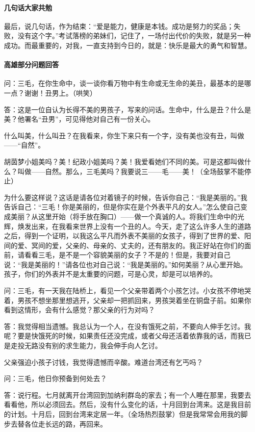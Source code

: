 \paragraph*{几句话大家共勉}
\par 最后，说几句话，作为结束：“爱是能力，健康是本钱。成功是努力的奖品；失败，没有这个字。”考试落榜的弟妹们，记住了，一场付出代价的失败，就是另一种成功。而最重要的，对我，一直支持到今日的，就是：快乐是最大的勇气和智慧。
\paragraph*{高雄部分问题回答}
\par 问：三毛，在你生命中，谈一谈你看万物中有生命或无生命的美丑，最基本的是哪一点？谢谢！丑男上。（哄笑）
\par 答：这是一位自认为长得不美的男孩子，写来的问话。生命中，什么是丑？什么是美？他署名“丑男”，可见得他对自己有一份关心。
\par 什么叫美，什么叫丑？在我看来，你生下来只有一个字，没有美也没有丑，叫做——“自然”。
\par 胡茵梦小姐美吗？美！纪政小姐美吗？美！我爱看她们不同的美。可是这都叫做什么？叫做——自然。那么，三毛美吗？我要说三——毛——美！（全场鼓掌不能停止）
\par 为什么要这样说？这话是请各位对着镜子的时候，告诉你自己：“我是美丽的。”我告诉自己：“三毛！你是美丽的，但是你实在是个外表平凡的女人。”怎么使自己变成美丽？从这里开始（将手放在胸口）——做一个真诚的人。将我们生命中的光辉，焕发出来，在我看来世界上没有一个丑的人。今天，走了这么许多人生的道路之后，得到一个证明，以我这么平凡而外表不美丽的女孩子，得到了世界的爱、阳间的爱、冥间的爱，父亲的、母亲的、丈夫的，还有朋友的。我正好站在你们的面前，请看看三毛，是不是一个容貌美丽的女子？不是的！但是，我要对自己说：“我是美丽的！”请各位也对自己说：“我是美丽的。”如何美丽？从心里开始。孩子，你们的外表并不是太重要的问题，可是心灵，却是可以培养的。
\par 问：三毛，有一天我在陆桥上，看见一个父亲带着两个小孩乞讨。小女孩不停地哭着，男孩不想坐那里想逃开，父亲却一把抓回来，男孩哭着坐在铜盘子前。如果你看到这情形，会有什么感觉？那父亲的行为对吗？
\par 答：我觉得相当遗憾。我总认为一个人，在没有饿死之前，不要向人伸手乞讨。我呢？要是快饿死的时候，如果责任还没完成，或者父母还活着依靠我的话，而我已是走投无路没有别的求生能力，我会伸手向人乞讨。
\par 父亲强迫小孩子讨钱，我觉得遗憾而辛酸。难道台湾还有乞丐吗？
\par 问：三毛，他日你预备到何处去？
\par 答：说行程。七月就离开台湾回到加纳利群岛的家去；有一个人睡在那里，我要去看看他，所以必须回去。然后，没有什么变化的话，十月回到台湾来。这是我目前的计划。十月后，回到台湾来定居一年。（全场热烈鼓掌）但是我常常会用我的脚步去替各位走长远的路，再回来。
